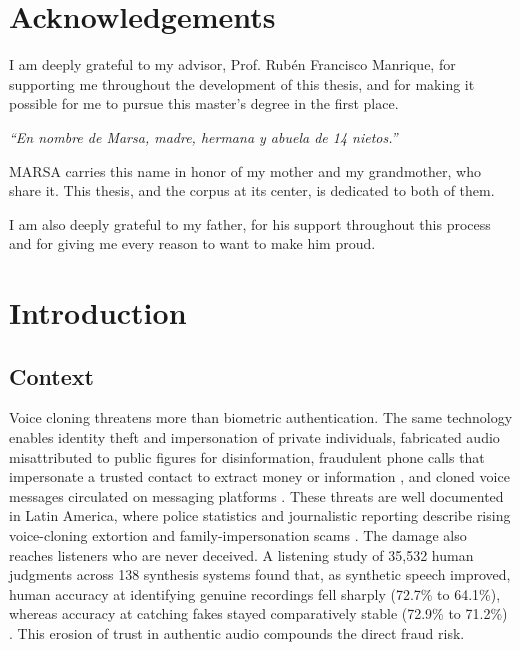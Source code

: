 \documentclass[11pt]{report}
\begin{document}
\chapter*{Acknowledgements}
I am deeply grateful to my advisor, Prof. Rub\'en Francisco Manrique,
for supporting me throughout the development of this thesis, and for
making it possible for me to pursue this master's degree in the first
place.

\begin{center}
\emph{``En nombre de Marsa, madre, hermana y abuela de 14 nietos.''}
\end{center}

MARSA carries this name in honor of my mother and my grandmother, who
share it. This thesis, and the corpus at its center, is dedicated to
both of them.

I am also deeply grateful to my father, for his support throughout
this process and for giving me every reason to want to make him
proud.

\tableofcontents
\listoffigures
\listoftables

\chapter{Introduction}
\label{ch:introduction}

\section{Context}

Voice cloning threatens more than biometric authentication.
The same technology enables identity theft and impersonation of private
individuals, fabricated audio misattributed to public figures for
disinformation, fraudulent phone calls that impersonate a trusted contact
to extract money or information
\citep{forbes2019ceofraud,destefano2023testimony,europol2022deepfakes}, and
cloned voice messages circulated on messaging platforms
\citep{infobae2026whatsapp}. These threats are well documented in Latin
America, where police statistics and journalistic reporting describe
rising voice-cloning extortion and family-impersonation scams
\citep{infobae2025colombia,infobae2026whatsapp}. The damage also reaches
listeners who are never deceived. A listening study of 35{,}532 human
judgments across 138 synthesis systems found that, as synthetic speech
improved, human accuracy at identifying genuine recordings fell sharply
(72.7\% to 64.1\%), whereas accuracy at catching fakes stayed comparatively
stable (72.9\% to 71.2\%) \citep{muller2026erodingtrust}. This erosion of
trust in authentic audio compounds the direct fraud risk.
\end{document}
